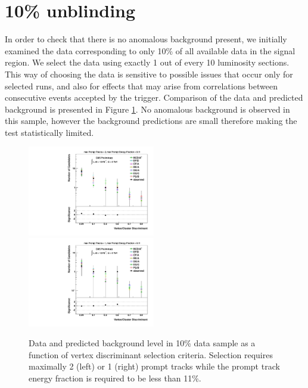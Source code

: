 \section{10\% unblinding}
\label{sec:partunblinding}

In order to check that there is no anomalous background present,
 we initially examined the data corresponding to only 10\% of all available 
data in the signal region.  
We select the data using exactly 1 out of every 10 luminosity sections. This way of choosing 
the data is sensitive to possible issues that occur only for selected runs, and also for effects that may arise from
correlations between consecutive events accepted by the trigger. Comparison of the data and predicted
background is presented in Figure \ref{fig:10percent}. No anomalous background is observed in this sample,
however the background predictions are small therefore making the test statistically limited.

\begin{figure}[htbp]
  \centering
  \includegraphics[width=0.495\textwidth]{plots/background/tenpercent1.pdf}
  \includegraphics[width=0.495\textwidth]{plots/background/tenpercent2.pdf}
  \caption{Data and predicted background level in 10\% data sample as a function of vertex discriminant
selection criteria. Selection requires maximally 2 (left) or 1 (right) prompt tracks while the prompt track energy 
fraction is required to be less than 11\%. \label{fig:10percent}}
\end{figure}  


